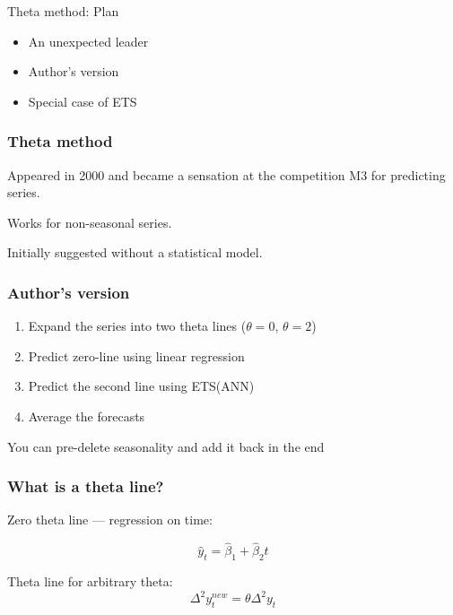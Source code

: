 
\begin{frame} %
	
	
\end{frame}


\begin{frame}{Theta method: Plan}
	\begin{itemize}[<+->]
		\item An unexpected leader
		\item Author's version
		\item Special case of ETS
	\end{itemize}
\end{frame}


\begin{frame}
	\frametitle{Theta method}
	
	Appeared in 2000 and became a sensation at the \alert{competition M3} for predicting series.
	
	\pause
	
	Works for \alert{non-seasonal} series.
	
	\pause
	
	Initially suggested \alert{without a statistical model}.
	
\end{frame}


\begin{frame}
	\frametitle{Author's version}
	
	\begin{enumerate}[<+->]
		\item Expand the series into two \alert{theta lines} ($\theta=0$, $\theta = 2$) 
		\item Predict zero-line using linear regression 
		\item Predict the second line using ETS(ANN)
		\item Average the forecasts
	\end{enumerate}
	
	\pause
	You can pre-delete seasonality and add it back in the end
	
\end{frame}

\begin{frame}
	\frametitle{What is a theta line?}
	
	Zero theta line — \alert{regression} on time:
	
	\[
	\hat y_t = \hat \beta_1 + \hat \beta_2 t
	\]
	\pause
	
	Theta line for arbitrary theta:
	\[
	\Delta^2 y^{new}_t = \theta \Delta^2 y_t
	\]
	
\end{frame}



